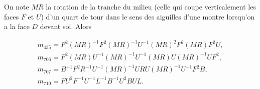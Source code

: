 \documentclass[french]{report}
\begin{document}
\begin{appendix}
  On note $MR$ la rotation de la tranche du milieu (celle qui coupe verticalement les faces $F$ et $U$) d'un quart de tour dans le sens des aiguilles d'une montre lorsqu'on a la face $D$ devant soi. Alors

  \begin{gather*}
    m _{435} = F ^2 (MR) ^{-1} F ^2 (MR) ^{-1} U ^{-1} (MR) ^2 F ^2 (MR) F ^2 U, \\
    m _{706} = F ^2 (MR) U ^{-1} (MR) ^{-1} U ^{-1} (MR) U (MR) ^{-1} U F ^2, \\
    m _{707} = B ^{-1} F ^2 R ^{-1} U ^{-1} (MR) ^{-1} U R U (MR) ^{-1} U ^{-1} F ^2 B, \\
    m _{710} = F U ^2 F ^{-1} U ^{-1}  L ^{-1} B ^{-1} U ^2 BUL.
  \end{gather*}

\end{appendix}
\end{document}
